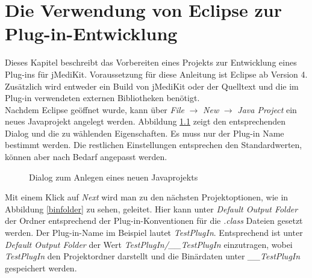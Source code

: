 \chapter{Die Verwendung von Eclipse zur Plug-in-Entwicklung}

Dieses Kapitel beschreibt das Vorbereiten eines Projekts zur Entwicklung eines Plug-ins für jMediKit. Voraussetzung für diese Anleitung ist Eclipse ab Version 4. Zusätzlich wird entweder ein Build von jMediKit oder der Quelltext und die im Plug-in verwendeten externen Bibliotheken benötigt.\\
Nachdem Eclipse geöffnet wurde, kann über \textit{File} $\rightarrow$ \textit{New} $\rightarrow$ \textit{Java Project} ein neues Javaprojekt angelegt werden. Abbildung \ref{newproject} zeigt den entsprechenden Dialog und die zu wählenden Eigenschaften. Es muss nur der Plug-in Name bestimmt werden. Die restlichen Einstellungen entsprechen den Standardwerten, können aber nach Bedarf angepasst werden.

\begin{figure}[H]
  \vspace{0.5cm}
  \centering
  \caption{Dialog zum Anlegen eines neuen Javaprojekts}
  \label{newproject}
  \vspace{0.5cm}
\end{figure}

Mit einem Klick auf \textit{Next} wird man zu den nächsten Projektoptionen, wie in Abbildung \ref{binfolder} zu sehen, geleitet. Hier kann unter \textit{Default Output Folder} der Ordner entsprechend der Plug-in-Konventionen für die \textit{.class} Dateien gesetzt werden. Der Plug-in-Name im Beispiel lautet \textit{TestPlugIn}. Entsprechend ist unter \textit{Default Output Folder} der Wert \mbox{\textit{TestPlugIn/\_\_TestPlugIn}} einzutragen, wobei \textit{TestPlugIn} den Projektordner darstellt und die Binärdaten unter \textit{\_\_TestPlugIn} gespeichert werden.

